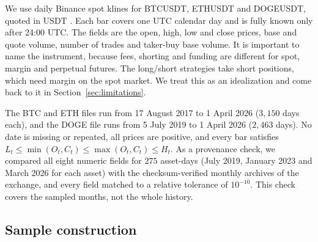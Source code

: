 \documentclass[preprint,12pt,authoryear,a4paper]{elsarticle}
\begin{document}
We use daily Binance spot klines for BTCUSDT, ETHUSDT and DOGEUSDT, quoted in USDT
\citep{binance2026data}. Each bar covers one UTC calendar day and is fully known
only after 24:00 UTC. The fields are the open, high, low and close prices, base and
quote volume, number of trades and taker-buy base volume. It is important to name
the instrument, because fees, shorting and funding are different for spot, margin
and perpetual futures. The long/short strategies take short positions, which need
margin on the spot market. We treat this as an idealization and come back to it in
Section~\ref{sec:limitations}.

The BTC and ETH files run from 17 August 2017 to 1 April 2026 ($3{,}150$ days each),
and the DOGE file runs from 5 July 2019 to 1 April 2026 ($2{,}463$ days). No date is
missing or repeated, all prices are positive, and every bar satisfies
$L_t\le\min(O_t,C_t)\le\max(O_t,C_t)\le H_t$. As a provenance check, we compared all
eight numeric fields for $275$ asset-days (July 2019, January 2023 and March 2026
for each asset) with the checksum-verified monthly archives of the exchange, and
every field matched to a relative tolerance of $10^{-10}$. This check covers the
sampled months, not the whole history.

\subsection{Sample construction}

\begin{table}[htbp]\centering\small
\caption{Sample reconciliation. Usable rows exclude the 60-day feature warm-up and
the last two days of each file. Out-of-sample (OOS) forecasts start after the
first $1{,}005$ usable rows ($1{,}000$ for initial training plus a five-row gap).
The panel has $5{,}562$ asset-day forecasts on $2{,}083$ distinct decision dates.}
\label{tab:data}
\end{table}
\end{document}
